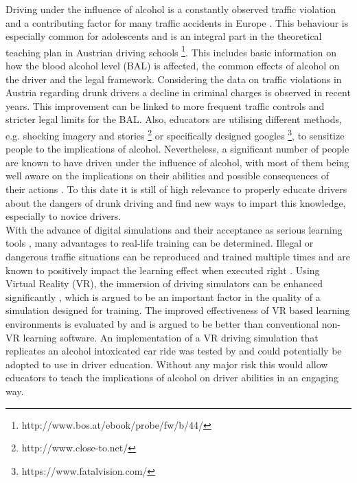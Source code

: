 Driving under the influence of alcohol is a constantly observed traffic violation and a contributing factor for many traffic accidents in Europe \autocite[]{fell2014update}.
This behaviour is especially common for adolescents \autocite[]{arnett1990drunk} and is an integral part in the theoretical teaching plan in Austrian driving schools  \footnote{http://www.bos.at/ebook/probe/fw/b/44/}.
This includes basic information on how the blood alcohol level (BAL) is affected, the common effects of alcohol on the driver and the legal framework.
Considering the data on traffic violations in Austria regarding drunk drivers \autocite[107]{bmasgk2019alkohol} a decline in criminal charges is observed in recent years.
This improvement can be linked to more frequent traffic controls and stricter legal limits for the BAL. 
Also, educators are utilising different methods, e.g. shocking imagery and stories \footnote{http://www.close-to.net/} or specifically designed googles \footnote{https://www.fatalvision.com/}, to sensitize people to the implications of alcohol.
Nevertheless, a significant number of people are known to have driven under the influence of alcohol, with most of them being well aware on the implications on their abilities and possible consequences of their actions \autocite[]{alonso2015driving}.
To this date it is still of high relevance to properly educate drivers about the dangers of drunk driving and find new ways to impart this knowledge, especially to novice drivers.
\\
With the advance of digital simulations and their acceptance as serious learning tools \autocite[]{backlund2006computer}, many advantages to real-life training can be determined. 
Illegal or dangerous traffic situations can be reproduced and trained multiple times and are known to positively impact the learning effect when executed right \autocite[]{vlakveld2005use}.
Using Virtual Reality (VR), the immersion of driving simulators can be enhanced significantly \autocite[498]{ihemedu2015development}, which is argued to be an important factor in the quality of a simulation designed for training. \autocite[2]{vlakveld2005use}
The improved effectiveness of VR based learning environments is evaluated by \textcite{chen2006design} and is argued to be better than conventional non-VR learning software. 
An implementation of a VR driving simulation that replicates an alcohol intoxicated car ride was tested by \textcite[]{von2016cyber} and could potentially be adopted to use in driver education.
Without any major risk this would allow educators to teach the implications of alcohol on driver abilities in an engaging way. 

